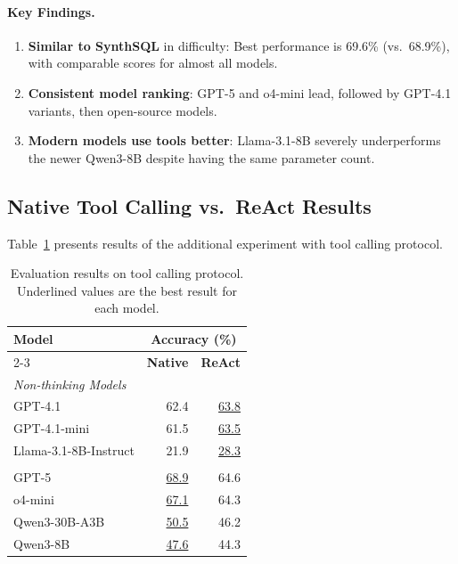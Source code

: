 \documentclass[11pt]{article}
\newcommand{\synthsubset}{SynthSQL\xspace}
\begin{document}
\paragraph{Key Findings.}
\begin{enumerate}
    \item \textbf{Similar to \synthsubset} in difficulty: Best performance is 69.6\% (vs.\ 68.9\%), with comparable scores for almost all models.
    \item \textbf{Consistent model ranking}: GPT-5 and o4-mini lead, followed by GPT-4.1 variants, then open-source models.
    \item \textbf{Modern models use tools better}: Llama-3.1-8B severely underperforms the newer Qwen3-8B despite having the same parameter count.
\end{enumerate}

\subsection{Native Tool Calling vs.\ ReAct Results}

Table~\ref{tab:react_results} presents results of the additional experiment with tool calling protocol.

\begin{table}[t]
\centering
\small
\setlength{\tabcolsep}{6pt}
\begin{tabular}{lrr}
\toprule
\textbf{Model} & \multicolumn{2}{c}{\textbf{Accuracy (\%)}} \\
\cmidrule(lr){2-3}
                       & \textbf{Native}    & \textbf{ReAct}    \\
\midrule
\multicolumn{3}{l}{\textit{Non-thinking Models}} \\
GPT-4.1                & 62.4               & \underline{63.8}  \\
GPT-4.1-mini           & 61.5               & \underline{63.5}  \\
Llama-3.1-8B-Instruct  & 21.9               & \underline{28.3}  \\
\addlinespace
\multicolumn{3}{l}{\textit{Thinking Models}} \\
GPT-5                  & \underline{68.9}   & 64.6              \\
o4-mini                & \underline{67.1}   & 64.3              \\
Qwen3-30B-A3B          & \underline{50.5}   & 46.2              \\
Qwen3-8B               & \underline{47.6}   & 44.3              \\
\bottomrule
\end{tabular}
\caption{Evaluation results on tool calling protocol. Underlined values are the best result for each model.}
\label{tab:react_results}
\end{table}
\end{document}
